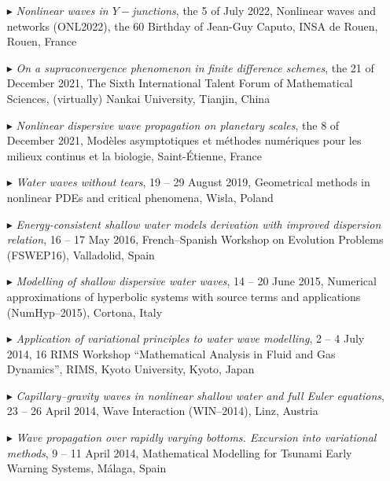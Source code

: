 \begin{itemize}

  \item[$\blacktriangleright$] \textit{Nonlinear waves in $Y-$junctions}, the 5 of July 2022, Nonlinear waves and networks (ONL2022), the $60$ Birthday of Jean-Guy Caputo, INSA de Rouen, Rouen, France

  \item[$\blacktriangleright$] \textit{On a supraconvergence phenomenon in finite difference schemes}, the 21 of December 2021, The Sixth International Talent Forum of Mathematical Sciences, (virtually) Nankai University, Tianjin, China

  \item[$\blacktriangleright$] \textit{Nonlinear dispersive wave propagation on planetary scales}, the 8 of December 2021, Mod\`eles asymptotiques et m\'ethodes num\'eriques pour les milieux continus et la biologie, Saint-\'Etienne, France

  \item[$\blacktriangleright$] \textit{Water waves without tears}, 19 -- 29 August 2019, Geometrical methods in nonlinear PDEs and critical phenomena, Wisla, Poland

  \item[$\blacktriangleright$] \textit{Energy-consistent shallow water models derivation with improved dispersion relation}, 16 -- 17 May 2016, French--Spanish Workshop on Evolution Problems (FSWEP16), Valladolid, Spain

  \item[$\blacktriangleright$] \textit{Modelling of shallow dispersive water waves}, 14 -- 20 June 2015, Numerical approximations of hyperbolic systems with source terms and applications (NumHyp--2015), Cortona, Italy

  \item[$\blacktriangleright$] \textit{Application of variational principles to water wave modelling}, 2 -- 4 July 2014, 16 RIMS Workshop ``Mathematical Analysis in Fluid and Gas Dynamics'', RIMS, Kyoto University, Kyoto, Japan

  \item[$\blacktriangleright$] \textit{Capillary--gravity waves in nonlinear shallow water and full Euler equations}, 23 -- 26 April 2014, Wave Interaction (WIN--2014), Linz, Austria

  \item[$\blacktriangleright$] \textit{Wave propagation over rapidly varying bottoms. Excursion into variational methods}, 9 -- 11 April 2014, Mathematical Modelling for Tsunami Early Warning Systems, M\'alaga, Spain


\end{itemize}
